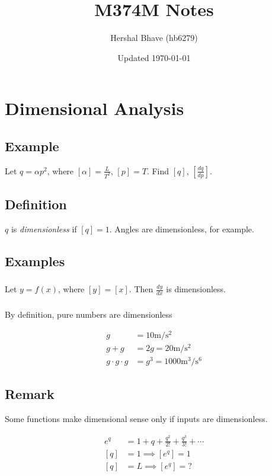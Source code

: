 \documentclass[12pt]{article}
\title{M374M Notes}
\author{Hershal Bhave (hb6279)}
\date{Updated \today}
\begin{document}
\maketitle
\tableofcontents

\newpage
\section{Dimensional Analysis}
\subsection{Example}
Let $q = \alpha p^2$, where $[\alpha] = \frac{L}{T^2}$, $[p] = T$. Find $[q]$,
$\left[\frac{dq}{dp}\right]$.

\subsection{Definition}
$q$ is \emph{dimensionless} if $[q] = 1$. Angles are dimensionless, for example.

\subsection{Examples}
\subsubsection{}
Let $y = f(x)$, where $[y] = [x]$. Then $\frac{dy}{dx}$ is dimensionless.

\subsubsection{}
By definition, pure numbers are dimensionless

\begin{equation}
  \begin{aligned}
    g &= 10 \text{m}/\text{s}^2 \\
    g + g &= 2g = 20 \text{m}/\text{s}^2 \\
    g \cdot g \cdot g & = g^3 = 1000 \text{m}^3/\text{s}^6
  \end{aligned}
\end{equation}

\subsection{Remark}
Some functions make dimensional sense only if inputs are dimensionless.

\begin{equation}
  \begin{aligned}
    e^q &= 1 + q + \frac{q^2}{2!} + \frac{q^3}{3!} + \cdots \\
    [q] &= 1 \implies [e^q] = 1 \\
    [q] &= L \implies [e^q] = ?
  \end{aligned}
\end{equation}
\end{document}
